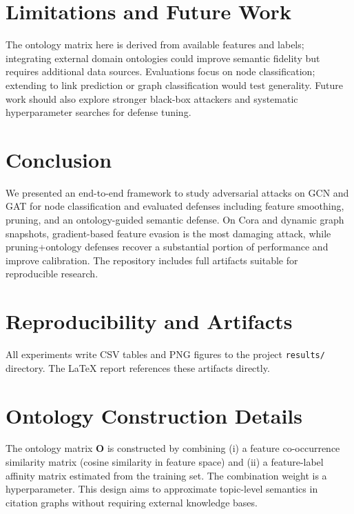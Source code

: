 \documentclass[conference]{IEEEtran}
\begin{document}
\section{Limitations and Future Work}
The ontology matrix here is derived from available features and labels; integrating external domain ontologies could improve semantic fidelity but requires additional data sources. Evaluations focus on node classification; extending to link prediction or graph classification would test generality. Future work should also explore stronger black-box attackers and systematic hyperparameter searches for defense tuning.

\section{Conclusion}
We presented an end-to-end framework to study adversarial attacks on GCN and GAT for node classification and evaluated defenses including feature smoothing, pruning, and an ontology-guided semantic defense. On Cora and dynamic graph snapshots, gradient-based feature evasion is the most damaging attack, while pruning+ontology defenses recover a substantial portion of performance and improve calibration. The repository includes full artifacts suitable for reproducible research.

\appendices
\section{Reproducibility and Artifacts}
All experiments write CSV tables and PNG figures to the project \texttt{results/} directory. The LaTeX report references these artifacts directly.

\section{Ontology Construction Details}
The ontology matrix $\mathbf{O}$ is constructed by combining (i) a feature co-occurrence similarity matrix (cosine similarity in feature space) and (ii) a feature-label affinity matrix estimated from the training set. The combination weight is a hyperparameter. This design aims to approximate topic-level semantics in citation graphs without requiring external knowledge bases.
\end{document}

